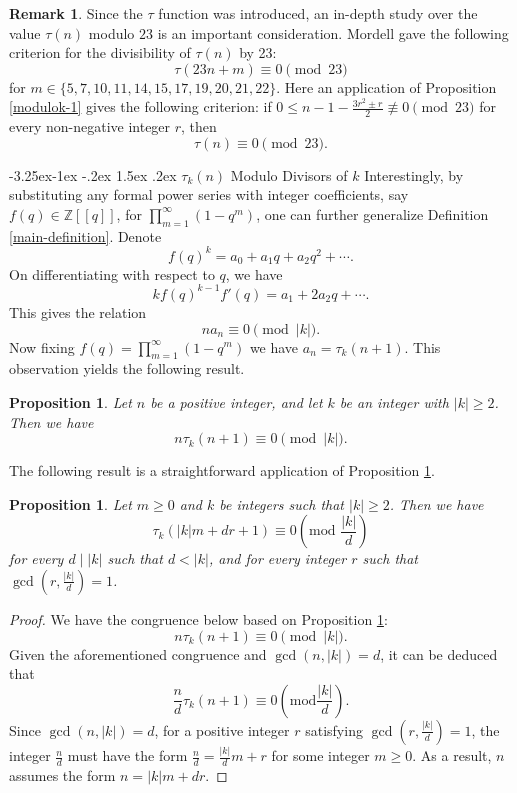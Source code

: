 \documentclass[10pt]{article}
\makeatletter
\renewcommand\subsection{\@startsection{subsection}{2}{\z@}
{-3.25ex\@plus -1ex \@minus -.2ex}
{1.5ex \@plus .2ex}
{\normalfont\normalsize\bfseries\boldmath}}
\newtheorem{proposition}[theorem]{Proposition}
\theoremstyle{definition}
\newtheorem{remark}[theorem]{Remark}
\makeatother
\begin{document}
\begin{remark}
Since the $\tau$ function was introduced, an in-depth study over the value $\tau(n)$ modulo ${23}$ is an important consideration. Mordell \cite{mordell-2} gave the following criterion for the divisibility of $\tau(n)$ by 23:
\[
\tau(23n+m)\equiv0\pmod{23}
\]
for $m\in\{5, 7, 10, 11, 14, 15, 17, 19, 20, 21, 22\}$. 
Here an application of Proposition \ref{modulok-1} gives the following criterion: if $0\leq n-1-\frac{3r^2\pm r}{2}\not\equiv 0\pmod{23}$ for every non-negative integer $r$, then 
\[\tau(n)\equiv0\pmod{23}.
\]
\end{remark}
\subsection{ $\tau_k(n)$ Modulo Divisors of $k$}
Interestingly, by substituting any formal power series with integer coefficients, say $f(q)\in\mathbb{Z}[[q]]$, for $\prod\limits_{m=1}^{\infty}(1-q^m)$, one can further generalize Definition \ref{main-definition}. Denote
\[f(q)^{k}=a_0+a_1q+a_2q^2+\cdots.
\]
On differentiating with respect to $q$, we have
\[k{f(q)}^{k-1}f'(q)=a_1+2a_2q+\cdots .
\]
This gives the relation
\[na_{n}\equiv 0\pmod{|k|}.
\]
Now fixing $f(q)=\prod\limits_{m=1}^{\infty}(1-q^m)$ we have $a_n=\tau_k(n+1)$. This observation yields the following result.
\begin{proposition}\label{modulok}
Let $n$ be a positive integer, and let $k$ be an integer with $\lvert k\rvert \geq 2$. Then we have
\[
n\tau_k(n+1)\equiv 0\pmod{|k|}.
\]
\end{proposition}
The following result is a straightforward application of Proposition \ref{modulok}.
\begin{proposition}\label{modulo-divisorsofk}
Let $m\geq 0$ and $k$ be integers such that $\lvert k\rvert\geq 2$. Then we have
\[
\tau_k(|k|m+dr+1)\equiv0\left(\textrm{mod\ }{\frac{|k|}{d}}\right)
\]
for every $d\mid |k|$ such that $d<|k|$, and for every integer $r$ such that $\gcd(r,\frac{|k|}{d})=1$.
\end{proposition}
\begin{proof}
We have the congruence below based on Proposition \ref{modulok}:
\[n\tau_k(n+1)\equiv0\pmod{|k|}.
\]
Given the aforementioned congruence and $\gcd(n,|k|)=d$, it can be deduced that 
\[\frac{n}{d}\tau_k(n+1)\equiv0\left(\textrm{mod}{\frac{|k|}{d}}\right). \]
Since $\gcd(n,|k|)=d$, for a positive integer $r$ satisfying $\gcd\left(r,\frac{|k|}{d}\right)=1$, the integer $\frac{n}{d}$ must have the form $\frac{n}{d}=\frac{|k|}{d}m+r$ for some integer $m\geq 0$. As a result, $n$ assumes the form $n=|k|m+dr$. 
\end{proof}
\end{document}
